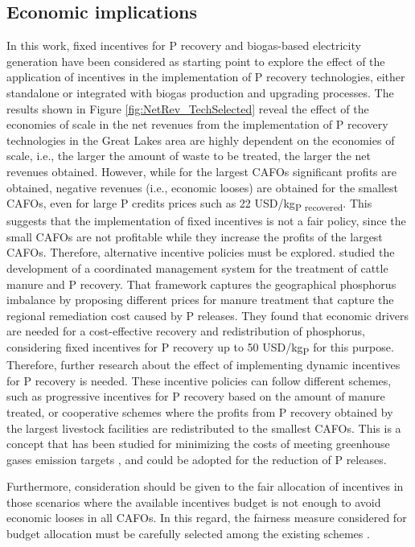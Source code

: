 \begin{refsection}[referencesCh4]
\subsection{Economic implications}
In this work, fixed incentives for P recovery and biogas-based electricity generation have been considered as starting point to explore the effect of the application of incentives in the implementation of P recovery technologies, either standalone or integrated with biogas production and upgrading processes.		
The results shown in Figure \ref{fig:NetRev_TechSelected} reveal the effect of the economies of scale in the net revenues from the implementation of P recovery technologies in the Great Lakes area are highly dependent on the economies of scale, i.e., the larger the amount of waste to be treated, the larger the net revenues obtained. However, while for the largest CAFOs significant profits are obtained, negative revenues (i.e., economic looses) are obtained for the smallest CAFOs, even for large P credits prices such as 22 USD/kg\textsubscript{P recovered}. This suggests that the implementation of fixed incentives is not a fair policy, since the small CAFOs are not profitable while they increase the profits of the largest CAFOs. Therefore, alternative incentive policies must be explored. \citet{sampat2019coordinated} studied the development of a coordinated management system for the treatment of cattle manure and P recovery. That framework captures the geographical phosphorus imbalance by proposing different prices for manure treatment that capture the regional remediation cost caused by P releases. They found that economic drivers are needed for a cost-effective recovery and redistribution of phosphorus, considering fixed incentives for P recovery up to 50 USD/kg\textsubscript{P} for this purpose. Therefore, further research about the effect of implementing dynamic incentives for P recovery is needed. These incentive policies can follow different schemes, such as progressive incentives for P recovery based on the amount of manure treated, or cooperative schemes where the profits from P recovery obtained by the largest livestock facilities are redistributed to the smallest CAFOs. This is a concept that has been studied for minimizing the costs of meeting greenhouse gases emission targets \citep{galan2018time}, and could be adopted for the reduction of P releases.

Furthermore, consideration should be given to the fair allocation of incentives in those scenarios where the available incentives budget is not enough to avoid economic looses in all CAFOs. In this regard, the fairness measure considered for budget allocation must be carefully selected among the existing schemes \citep{sampat2019fairness}. 


\end{refsection}
